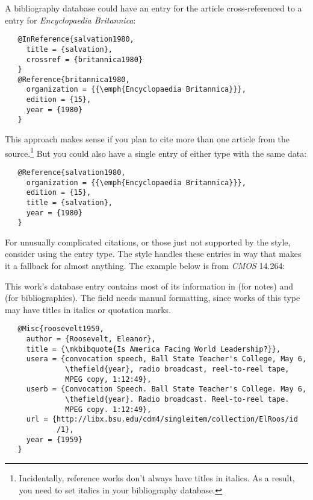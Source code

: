 \documentclass[11pt,letterpaper,oneside]{article}
\begin{document}
\begin{citeonly}
\item \cite{salvation1980}
\end{citeonly}

A bibliography database could have an  entry for
the article cross-ref\-er\-enc\-ed to a  entry for
\textit{Encyclopaedia Britannica}:

\begin{verbatim}
   @InReference{salvation1980,
     title = {salvation},
     crossref = {britannica1980}
   }
   @Reference{britannica1980,
     organization = {{\emph{Encyclopaedia Britannica}}},
     edition = {15},
     year = {1980}
   }
\end{verbatim}

\noindent This approach makes sense if you plan to cite more than one
article from the source.\footnote{Incidentally, reference works don't
always have titles in italics. As a result, you need to set italics in
your bibliography database.} But you could also have a single entry of
either type with the same data:

\begin{verbatim}
   @Reference{salvation1980,
     organization = {{\emph{Encyclopaedia Britannica}}},
     edition = {15},
     title = {salvation},
     year = {1980}
   }
\end{verbatim}

For unusually complicated citations, or those just not supported by
the style, consider using the  entry type. The style
handles these entries in way that makes it a fallback for almost
anything. The example below is from \textit{CMOS} 14.264:

\begin{citebib}
\item \cite{roosevelt1959}
\end{citebib}

\noindent This work's database entry contains most of its information
in  (for notes) and  (for
bibliographies). The  field needs manual formatting,
since works of this type may have titles in italics or quotation
marks.

\begin{verbatim}
   @Misc{roosevelt1959,
     author = {Roosevelt, Eleanor},
     title = {\mkbibquote{Is America Facing World Leadership?}},
     usera = {convocation speech, Ball State Teacher's College, May 6,
              \thefield{year}, radio broadcast, reel-to-reel tape,
              MPEG copy, 1:12:49},
     userb = {Convocation Speech. Ball State Teacher's College. May 6,
              \thefield{year}. Radio broadcast. Reel-to-reel tape.
              MPEG copy. 1:12:49},
     url = {http://libx.bsu.edu/cdm4/singleitem/collection/ElRoos/id
            /1},
     year = {1959}
   }
\end{verbatim}
\end{document}
